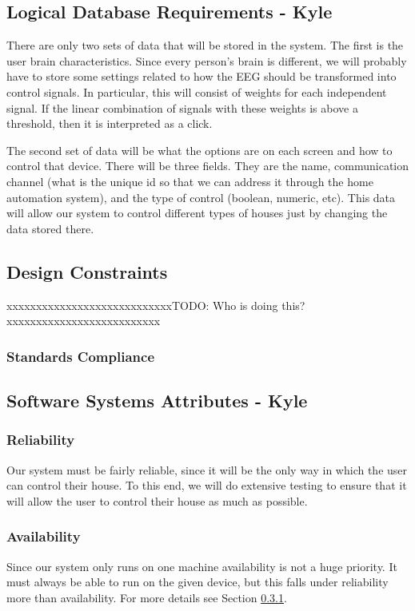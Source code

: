 \documentclass{article}
\begin{document}
\subsection{Logical Database Requirements - Kyle}
There are only two sets of data that will be stored in the system. The first is the user brain characteristics. Since every person's brain is different, we will probably have to store some settings related to how the EEG should be transformed into control signals. In particular, this will consist of weights for each independent signal. If the linear combination of signals with these weights is above a threshold, then it is interpreted as a click.

The second set of data will be what the options are on each screen and how to control that device. There will be three fields. They are the name, communication channel (what is the unique id so that we can address it through the home automation system), and the type of control (boolean, numeric, etc). This data will allow our system to control different types of houses just by changing the data stored there.

\subsection{Design Constraints}
{\color{red}xxxxxxxxxxxxxxxxxxxxxxxxxxxxTODO: Who is doing this?xxxxxxxxxxxxxxxxxxxxxxxxxx}

\subsubsection{Standards Compliance}

\subsection{Software Systems Attributes - Kyle}

\subsubsection{Reliability} \label{sec:reliability}
Our system must be fairly reliable, since it will be the only way in which the user can control their house. To this end, we will do extensive testing to ensure that it will allow the user to control their house as much as possible.

\subsubsection{Availability}
Since our system only runs on one machine availability is not a huge priority. It must always be able to run on the given device, but this falls under reliability more than availability. For more details see Section \ref{sec:reliability}.
\end{document}

